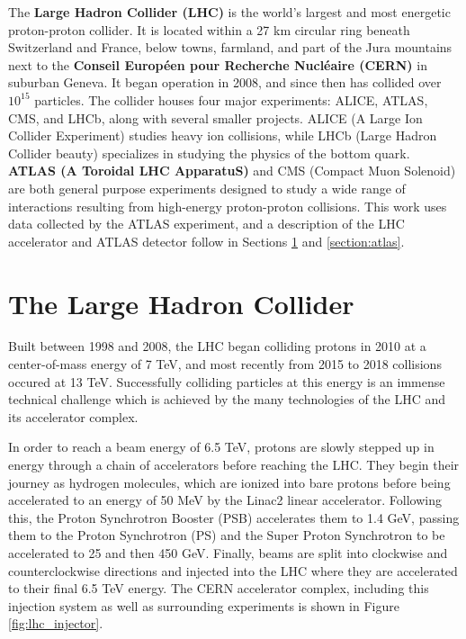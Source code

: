 \label{chapter:lhcatlas}

The \textbf{Large Hadron Collider (LHC)} is the world's largest and most energetic proton-proton collider. It is located within a 27 km circular ring beneath Switzerland and France, below towns, farmland, and part of the Jura mountains next to the \textbf{Conseil Européen pour Recherche Nucléaire (CERN)} in suburban Geneva. It began operation in 2008, and since then has collided over $10^{15}$ particles. The collider houses four major experiments: ALICE, ATLAS, CMS, and LHCb, along with several smaller projects. ALICE (A Large Ion Collider Experiment) studies heavy ion collisions, while LHCb (Large Hadron Collider beauty) specializes in studying the physics of the bottom quark. \textbf{ATLAS (A Toroidal LHC ApparatuS)} and CMS (Compact Muon Solenoid) are both general purpose experiments designed to study a wide range of interactions resulting from high-energy proton-proton collisions. This work uses data collected by the ATLAS experiment, and a description of the LHC accelerator and ATLAS detector follow in Sections \ref{section:lhc} and \ref{section:atlas}.

\section{The Large Hadron Collider}
\label{section:lhc}
Built between 1998 and 2008, the LHC \cite{LHCDesign} began colliding protons in 2010 at a center-of-mass energy of 7 TeV, and most recently from 2015 to 2018 collisions occured at 13 TeV. Successfully colliding particles at this energy is an immense technical challenge which is achieved by the many technologies of the LHC and its accelerator complex.

In order to reach a beam energy of 6.5 TeV, protons are slowly stepped up in energy through a chain of accelerators before reaching the LHC. They begin their journey as hydrogen molecules, which are ionized into bare protons before being accelerated to an energy of 50 MeV by the Linac2 linear accelerator. Following this, the Proton Synchrotron Booster (PSB) accelerates them to 1.4 GeV, passing them to the Proton Synchrotron (PS) and the Super Proton Synchrotron to be accelerated to 25 and then 450 GeV. Finally, beams are split into clockwise and counterclockwise directions and injected into the LHC where they are accelerated to their final 6.5 TeV energy. The CERN accelerator complex, including this injection system as well as surrounding experiments is shown in Figure \ref{fig:lhc_injector}.

